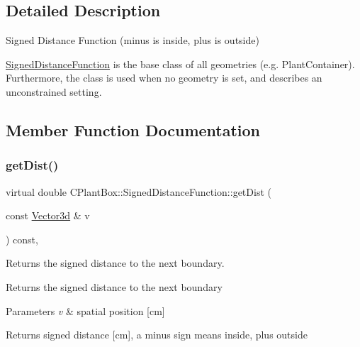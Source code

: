\subsection{Detailed Description}
Signed Distance Function (minus is inside, plus is outside)

\hyperlink{classCPlantBox_1_1SignedDistanceFunction}{Signed\+Distance\+Function} is the base class of all geometries (e.\+g. Plant\+Container). Furthermore, the class is used when no geometry is set, and describes an unconstrained setting. 

\subsection{Member Function Documentation}
\mbox{\label{classCPlantBox_1_1SignedDistanceFunction_a8e58237574af3673906bba84d5d14ee8}} 
\subsubsection{\texorpdfstring{get\+Dist()}{getDist()}}
{\footnotesize\ttfamily virtual double C\+Plant\+Box\+::\+Signed\+Distance\+Function\+::get\+Dist (\begin{DoxyParamCaption}\item[{const \hyperlink{classCPlantBox_1_1Vector3d}{Vector3d} \&}]{v }\end{DoxyParamCaption}) const\hspace{0.3cm}{\ttfamily [inline]}, {\ttfamily [virtual]}}



Returns the signed distance to the next boundary. 

Returns the signed distance to the next boundary


\begin{DoxyParams}{Parameters}
{\em v} & spatial position \mbox{[}cm\mbox{]} \\
\hline
\end{DoxyParams}
\begin{DoxyReturn}{Returns}
signed distance \mbox{[}cm\mbox{]}, a minus sign means inside, plus outside 
\end{DoxyReturn}


